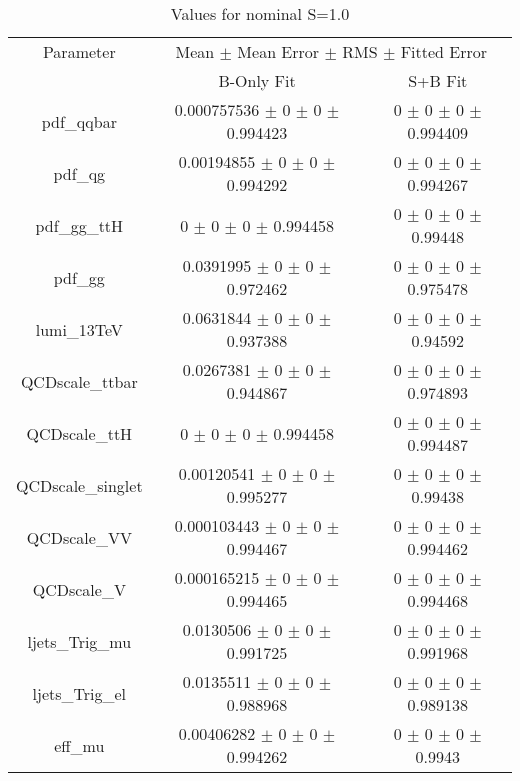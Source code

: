 \begin{table}
\centering
\caption{Values for nominal S=1.0}
\begin{tabular}{ccc}
\toprule
Parameter 	& \multicolumn{2}{c}{Mean $\pm$ Mean Error $\pm$ RMS $\pm$ Fitted Error}\\
 	& B-Only Fit & S+B Fit\\
\midrule
pdf\_qqbar 	& \num{0.000757536} $\pm$ \num{0} $\pm$ \num{0} $\pm$ \num{0.994423} 	& \num{0} $\pm$ \num{0} $\pm$ \num{0} $\pm$ \num{0.994409}\\
pdf\_qg 	& \num{0.00194855} $\pm$ \num{0} $\pm$ \num{0} $\pm$ \num{0.994292} 	& \num{0} $\pm$ \num{0} $\pm$ \num{0} $\pm$ \num{0.994267}\\
pdf\_gg\_ttH 	& \num{0} $\pm$ \num{0} $\pm$ \num{0} $\pm$ \num{0.994458} 	& \num{0} $\pm$ \num{0} $\pm$ \num{0} $\pm$ \num{0.99448}\\
pdf\_gg 	& \num{0.0391995} $\pm$ \num{0} $\pm$ \num{0} $\pm$ \num{0.972462} 	& \num{0} $\pm$ \num{0} $\pm$ \num{0} $\pm$ \num{0.975478}\\
lumi\_13TeV 	& \num{0.0631844} $\pm$ \num{0} $\pm$ \num{0} $\pm$ \num{0.937388} 	& \num{0} $\pm$ \num{0} $\pm$ \num{0} $\pm$ \num{0.94592}\\
QCDscale\_ttbar 	& \num{0.0267381} $\pm$ \num{0} $\pm$ \num{0} $\pm$ \num{0.944867} 	& \num{0} $\pm$ \num{0} $\pm$ \num{0} $\pm$ \num{0.974893}\\
QCDscale\_ttH 	& \num{0} $\pm$ \num{0} $\pm$ \num{0} $\pm$ \num{0.994458} 	& \num{0} $\pm$ \num{0} $\pm$ \num{0} $\pm$ \num{0.994487}\\
QCDscale\_singlet 	& \num{0.00120541} $\pm$ \num{0} $\pm$ \num{0} $\pm$ \num{0.995277} 	& \num{0} $\pm$ \num{0} $\pm$ \num{0} $\pm$ \num{0.99438}\\
QCDscale\_VV 	& \num{0.000103443} $\pm$ \num{0} $\pm$ \num{0} $\pm$ \num{0.994467} 	& \num{0} $\pm$ \num{0} $\pm$ \num{0} $\pm$ \num{0.994462}\\
QCDscale\_V 	& \num{0.000165215} $\pm$ \num{0} $\pm$ \num{0} $\pm$ \num{0.994465} 	& \num{0} $\pm$ \num{0} $\pm$ \num{0} $\pm$ \num{0.994468}\\
ljets\_Trig\_mu 	& \num{0.0130506} $\pm$ \num{0} $\pm$ \num{0} $\pm$ \num{0.991725} 	& \num{0} $\pm$ \num{0} $\pm$ \num{0} $\pm$ \num{0.991968}\\
ljets\_Trig\_el 	& \num{0.0135511} $\pm$ \num{0} $\pm$ \num{0} $\pm$ \num{0.988968} 	& \num{0} $\pm$ \num{0} $\pm$ \num{0} $\pm$ \num{0.989138}\\
eff\_mu 	& \num{0.00406282} $\pm$ \num{0} $\pm$ \num{0} $\pm$ \num{0.994262} 	& \num{0} $\pm$ \num{0} $\pm$ \num{0} $\pm$ \num{0.9943}\\

\end{tabular}
\end{table}
